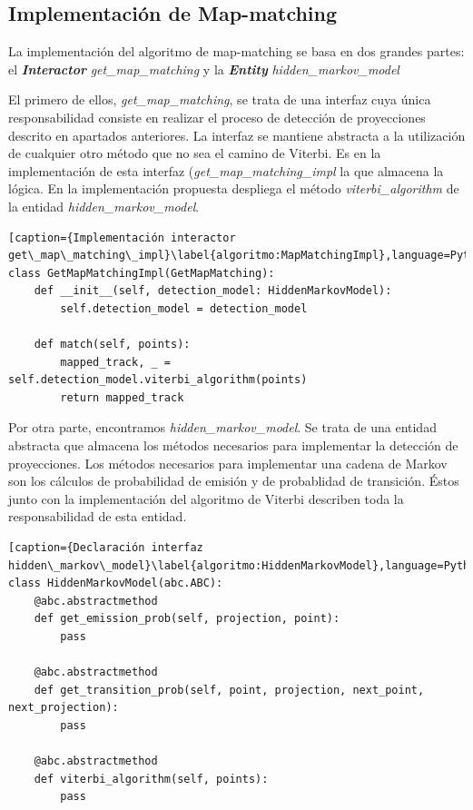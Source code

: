 \subsection{Implementación de Map-matching}
La implementación del algoritmo de map-matching se basa en dos grandes partes: 
el \textbf{\textit{Interactor}} \textit{get\_map\_matching} y la \textbf{\textit{Entity}} 
\textit{hidden\_markov\_model}

El primero de ellos, \textit{get\_map\_matching}, se trata de una interfaz cuya única responsabilidad 
consiste en realizar el proceso de detección de proyecciones descrito en apartados anteriores. La 
interfaz se mantiene abstracta a la utilización de cualquier otro método que no sea el camino de 
Viterbi. Es en la implementación de esta interfaz (\textit{get\_map\_matching\_impl} la que almacena 
la lógica. En la implementación propuesta despliega el método \textit{viterbi\_algorithm} de la 
entidad \textit{hidden\_markov\_model}.

\begin{lstlisting}[caption={Implementación interactor get\_map\_matching\_impl}\label{algoritmo:MapMatchingImpl},language=Python] 
class GetMapMatchingImpl(GetMapMatching):
    def __init__(self, detection_model: HiddenMarkovModel):
        self.detection_model = detection_model

    def match(self, points):
        mapped_track, _ = self.detection_model.viterbi_algorithm(points)
        return mapped_track
\end{lstlisting}

Por otra parte, encontramos \textit{hidden\_markov\_model}. Se trata de una entidad abstracta que 
almacena los métodos necesarios para implementar la detección de proyecciones. Los métodos 
necesarios para implementar una cadena de Markov son los cálculos de probabilidad de emisión y 
de probablidad de transición. Éstos junto con la implementación del algoritmo de Viterbi describen 
toda la responsabilidad de esta entidad.

\begin{lstlisting}[caption={Declaración interfaz hidden\_markov\_model}\label{algoritmo:HiddenMarkovModel},language=Python] 
class HiddenMarkovModel(abc.ABC):
    @abc.abstractmethod
    def get_emission_prob(self, projection, point):
        pass

    @abc.abstractmethod
    def get_transition_prob(self, point, projection, next_point, next_projection):
        pass

    @abc.abstractmethod
    def viterbi_algorithm(self, points):
        pass
\end{lstlisting}

